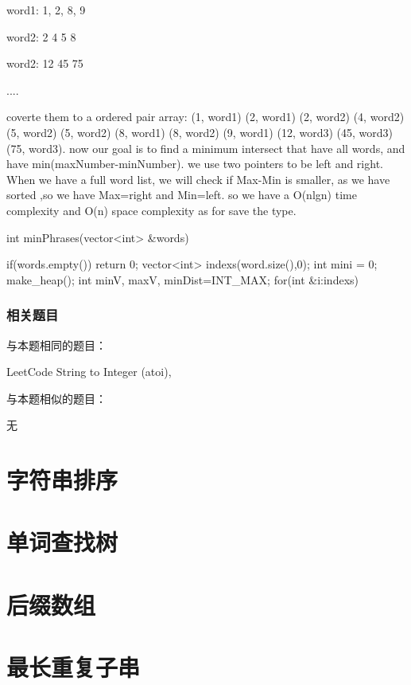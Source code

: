 	word1: 1, 2, 8, 9
	
	word2: 2 4 5 8
	
	word2: 12 45 75
	
	....
	
	coverte them to a ordered pair array: (1, word1) (2, word1) (2, word2) (4, word2) (5, word2) (5, word2) (8, word1) (8, word2) (9, word1) (12, word3) (45, word3) (75, word3).
	now our goal is to find a minimum intersect that have all words, and have min(maxNumber-minNumber).
	we use two pointers to be left and right. When we have a full word list, we will check if Max-Min is smaller, as we have sorted ,so we have Max=right and Min=left. so we have 
	a O(nlgn) time complexity and O(n) space complexity as for save the type.
	
\myenddot

\begin{Code}
	int minPhrases(vector<int> &words){
		if(words.empty()) return 0;
		vector<int> indexs(word.size(),0);
		int mini = 0;
		make_heap();
		int minV, maxV, minDist=INT_MAX;
		for(int &i:indexs){
			
		}
	}
\end{Code}

\subsubsection{相关题目}
与本题相同的题目：
\begindot
\item LeetCode String to Integer (atoi), 
\myenddot

与本题相似的题目：
\begindot
\item  无
\myenddot


\section{字符串排序} %


\section{单词查找树} %

\section{后缀数组} %
\section{最长重复子串} %
